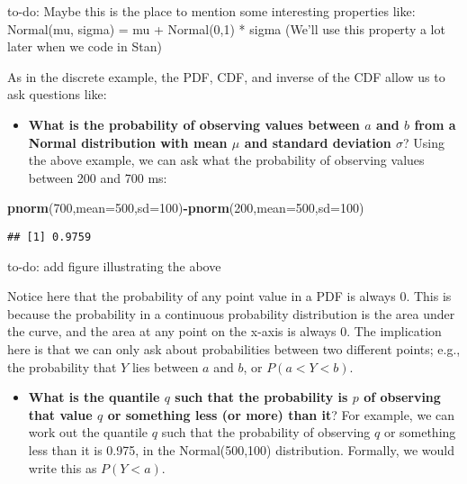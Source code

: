 \documentclass[12pt,]{krantz}
\newenvironment{Shaded}{\begin{snugshade}}{\end{snugshade}}
\newcommand{\DataTypeTok}[1]{\textcolor[rgb]{0.13,0.29,0.53}{#1}}
\newcommand{\DecValTok}[1]{\textcolor[rgb]{0.00,0.00,0.81}{#1}}
\newcommand{\KeywordTok}[1]{\textcolor[rgb]{0.13,0.29,0.53}{\textbf{#1}}}
\newcommand{\NormalTok}[1]{#1}
\newcommand{\OperatorTok}[1]{\textcolor[rgb]{0.81,0.36,0.00}{\textbf{#1}}}
\providecommand{\tightlist}{%
  \setlength{\itemsep}{0pt}\setlength{\parskip}{0pt}}
\let\BeginKnitrBlock\begin \let\EndKnitrBlock\end
\begin{document}
\BeginKnitrBlock{rmdnote}
to-do: Maybe this is the place to mention some interesting properties like:
Normal(mu, sigma) = mu + Normal(0,1) * sigma
(We'll use this property a lot later when we code in Stan)
\EndKnitrBlock{rmdnote}

As in the discrete example, the PDF, CDF, and inverse of the CDF allow us to ask questions like:

\begin{itemize}
\tightlist
\item
  \textbf{What is the probability of observing values between \(a\) and \(b\) from a Normal distribution with mean \(\mu\) and standard deviation \(\sigma\)}? Using the above example, we can ask what the probability of observing values between 200 and 700 ms:
\end{itemize}

\begin{Shaded}
\begin{Highlighting}[]
\KeywordTok{pnorm}\NormalTok{(}\DecValTok{700}\NormalTok{,}\DataTypeTok{mean=}\DecValTok{500}\NormalTok{,}\DataTypeTok{sd=}\DecValTok{100}\NormalTok{)}\OperatorTok{-}\KeywordTok{pnorm}\NormalTok{(}\DecValTok{200}\NormalTok{,}\DataTypeTok{mean=}\DecValTok{500}\NormalTok{,}\DataTypeTok{sd=}\DecValTok{100}\NormalTok{)}
\end{Highlighting}
\end{Shaded}

\begin{verbatim}
## [1] 0.9759
\end{verbatim}

\BeginKnitrBlock{rmdnote}
to-do: add figure illustrating the above
\EndKnitrBlock{rmdnote}

Notice here that the probability of any point value in a PDF is always \(0\). This is because the probability in a continuous probability distribution is the area under the curve, and the area at any point on the x-axis is always \(0\). The implication here is that we can only ask about probabilities between two different points; e.g., the probability that \(Y\) lies between \(a\) and \(b\), or \(P(a<Y<b)\).

\begin{itemize}
\tightlist
\item
  \textbf{What is the quantile \(q\) such that the probability is \(p\) of observing that value \(q\) or something less (or more) than it}? For example, we can work out the quantile \(q\) such that the probability of observing \(q\) or something less than it is 0.975, in the Normal(500,100) distribution. Formally, we would write this as \(P(Y<a)\).
\end{itemize}
\end{document}
